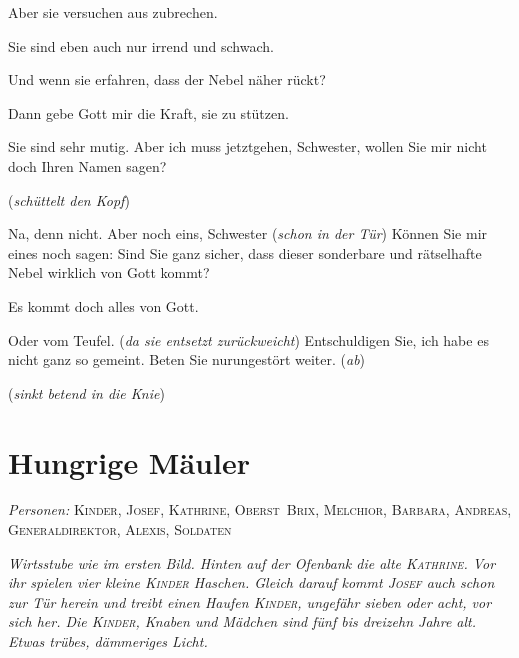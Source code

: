 \documentclass[
	final,
	a4paper,
	ngerman,
	mpinclude = true, %
	twoside = true,
	open = right,
	cleardoublepage = plain,
	DIV = 13,
	BCOR = 1cm,
	titlepage = firstiscover,
	]{scrbook}
\newcommand{\scene}{\setcounter{subscene}{1}\section}
\newcommand{\direction}[1]{(\textit{#1})}
\newcommand{\setting}[1]{\vspace{-0.5\baselineskip}\centering\textit{#1}}
\newcounter{subscene}
\newcommand{\characterlist}[1]{{\begin{center}\textit{Personen:}\quad{}#1\end{center}}}
\newcommand{\thecharacter}[1]{\textup{\textsc{#1}}\xspace}
\newcommand{\theBarbara}{\thecharacter{Barbara}}
\newcommand{\theJosef}{\thecharacter{Josef}}
\newcommand{\theKathrine}{\thecharacter{Kathrine}}
\newcommand{\theAndreas}{\thecharacter{Andreas}}
\newcommand{\theGeneraldirektor}{\thecharacter{Generaldirektor}}
\newcommand{\theAlexis}{\thecharacter{Alexis}}
\newcommand{\theSalwin}{\thecharacter{Salwin}}
\newcommand{\theBrix}{\thecharacter{Oberst~Brix}}
\newcommand{\theMelchior}{\thecharacter{Melchior}}
\newcommand{\theKinder}{\thecharacter{Kinder}}
\newcommand{\theSoldaten}{\thecharacter{Soldaten}}
\newcommand{\character}[1]{\item[#1]}
\newcommand{\Salwin}{\character{\theSalwin}}
\newcommand{\Heilsarmeeschwester}{\character{Schwester}}
\begin{document}
\begin{play}
\Salwin
Aber sie versuchen aus zubrechen.

\Heilsarmeeschwester
Sie sind eben auch nur irrend und schwach.

\Salwin
Und wenn sie erfahren, dass der Nebel näher rückt?

\Heilsarmeeschwester
Dann gebe Gott mir die Kraft, sie zu stützen.

\Salwin
Sie sind sehr mutig. Aber ich muss jetztgehen, Schwester, wollen Sie mir nicht doch Ihren Namen sagen?

\Heilsarmeeschwester
\direction{schüttelt den Kopf}

\Salwin
Na, denn nicht. Aber noch eins, Schwester \direction{schon in der Tür} Können Sie mir eines noch sagen: Sind Sie ganz sicher, dass dieser sonderbare und rätselhafte Nebel wirklich von Gott kommt?

\Heilsarmeeschwester
Es kommt doch alles von Gott.

\Salwin
Oder vom Teufel. \direction{da sie entsetzt zurückweicht} Entschuldigen Sie, ich habe es nicht ganz so gemeint. Beten Sie nurungestört weiter. \direction{ab}

\Heilsarmeeschwester
\direction{sinkt betend in die Knie}

\end{play}



\scene{Hungrige Mäuler}
\label{scene:IV}
\characterlist{
	\theKinder,
	\theJosef,
	\theKathrine,
	\theBrix,
	\theMelchior,
	\theBarbara,
	\theAndreas,
	\theGeneraldirektor,
	\theAlexis,
	\theSoldaten
}
\setting{Wirtsstube wie im ersten Bild. Hinten auf der Ofenbank die alte \theKathrine. Vor ihr spielen vier kleine \theKinder Haschen. Gleich darauf kommt \theJosef auch schon zur Tür herein und treibt einen Haufen \theKinder, ungefähr sieben oder acht, vor sich her. Die \theKinder, Knaben und Mädchen sind fünf bis dreizehn Jahre alt. Etwas trübes, dämmeriges Licht.}
\end{document}
